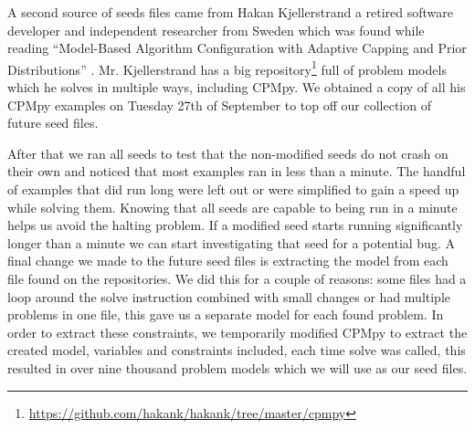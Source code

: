 A second source of seeds files came from Hakan Kjellerstrand a retired software developer and independent researcher from Sweden which was found while reading “Model-Based Algorithm Configuration with Adaptive Capping and Prior Distributions” \cite{18bleukx2022model}. Mr. Kjellerstrand has a big repository\footnote{\url{https://github.com/hakank/hakank/tree/master/cpmpy}} full of problem models which he solves in multiple ways, including CPMpy. We obtained a copy of all his CPMpy examples on Tuesday 27th of September to top off our collection of future seed files.


After that we ran all seeds to test that the non-modified seeds do not crash on their own and noticed that most examples ran in less than a minute. The handful of examples that did run long were left out or were simplified to gain a speed up while solving them. Knowing that all seeds are capable to being run in a minute helps us avoid the halting problem. If a modified seed starts running significantly longer than a minute we can start investigating that seed for a potential bug. A final change we made to the future seed files is extracting the model from each file found on the repositories. We did this for a couple of reasons: some files had a loop around the solve instruction combined with small changes or had multiple problems in one file, this gave us a separate model for each found problem. In order to extract these constraints, we temporarily modified CPMpy to extract the created model, variables and constraints included, each time solve was called, this resulted in over nine thousand problem models which we will use as our seed files.



